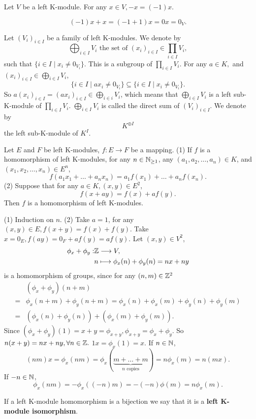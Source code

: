 \documentclass{book}
\numberwithin{equation}{section}
\begin{document}
\begin{propositionenv}
    Let $V$ be a left K-module. For any $x\in V,  -x=(-1)x$.
\end{propositionenv}
\begin{proofenv}
    $$(-1)x+x=(-1+1)x=0x=0_V.$$
\end{proofenv}
\begin{exampleenv}
    Let $(V_i)_{i\in I}$ be a family of left K-modules. We denote by 
    $$\bigoplus_{i\in I}V_i\text{ the set of }(x_i)_{i\in I}\in \prod_{i\in I}V_i, $$
    such that $\{i\in I\mid x_i\not=0_{V_i}\}$. This is a subgroup of $\prod_{i\in I}V_i$. For any $a\in K, $ and $(x_i)_{i\in I}\in \bigoplus_{i\in I}V_i$, 
    $$\{i\in I\mid ax_i\not=0_{V_i}\}\subseteq\{i\in I\mid x_i\not=0_{V_i}\}.$$
    So $\displaystyle a(x_i)_{i\in I}=(ax_i)_{i\in I}\in \bigoplus_{i\in i}V_i$,  which means that $\displaystyle\bigoplus_{i\in I}V_i$ is a left sub-K-module of $\displaystyle\prod_{i\in I}V_i$. $\displaystyle\bigoplus_{i\in I}V_i$ is called the direct sum of $(V_i)_{i\in I}$. We denote by 
    $$K^{\oplus I}$$
    the left sub-K-module of $K^I$.
\end{exampleenv}
\begin{propositionenv}
    Let $E$ and $F$ be left K-modules,  $f:E\rightarrow F$ be a mapping.
    \newline
    (1) If $f$ is a homomorphism of left K-modules,  for any $n\in \mathbb{N}_{\ge1}$,  any $(a_1, a_2, \dots, a_n)\in K$,  and $(x_1, x_2, \dots, x_n)\in E^n$, 
    $$f(a_1x_1+\dots+a_nx_n)=a_1f(x_1)+\dots+a_nf(x_n).$$
    (2) Suppose that for any $a\in K, (x, y)\in E^2$, 
    $$f(x+ay)=f(x)+af(y).$$
    Then $f$ is a homomorphism of left K-modules.
\end{propositionenv}
\begin{proofenv}
    (1) Induction on $n$.
    \newline
    (2) Take $a=1$,  for any $(x, y)\in E, f(x+y)=f(x)+f(y)$. Take $x=0_E, f(ay)=0_F+af(y)=af(y)$. Let $(x, y)\in V^2$, 
    \begin{align*}
        \phi_x+\phi_y:&\mathbb{Z} \longrightarrow V, \\
        &n\longmapsto \phi_x(n)+\phi_y(n)=nx+ny
    \end{align*}
    is a homomorphism of groups,  since for any $(n, m)\in \mathbb{Z}^2$
    \begin{align*}
        &(\phi_x+\phi_y)(n+m)\\
        =&\phi_x(n+m)+\phi_y(n+m)=\phi_x(n)+\phi_x(m)+\phi_y(n)+\phi_y(m)\\
        =&(\phi_x(n)+\phi_y(n))+(\phi_x(m)+\phi_y(m)).
    \end{align*}
    Since $(\phi_x+\phi_y)(1)=x+y=\phi_{x+y}, \phi_{x+y}=\phi_x+\phi_y.$ So $n(x+y)=nx+ny,  \forall n\in\mathbb{Z}.$ $1x=\phi_x(1)=x.$
    If $n\in \mathbb{N}$, 
    $$(nm)x=\phi_x(nm)=\phi_x(\underset{n \text{ copies}}{\underbrace{m+\dots+m}})=n\phi_x(m)=n(mx).$$
    If $-n\in \mathbb{N}$, 
    $$\phi_x(nm)=-\phi_x((-n)m)=-(-n)\phi(m)=n\phi_x(m).$$
\end{proofenv}
\begin{definitionenv}
    If a left K-module homomorphism is a bijection we say that it is a \textbf{left K-module isomorphism}.
\end{definitionenv}
\end{document}
